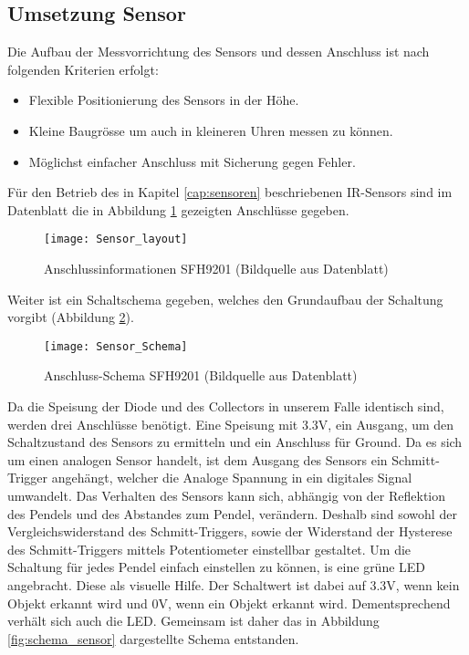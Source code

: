\subsection{Umsetzung Sensor}
	Die Aufbau der Messvorrichtung des Sensors und dessen Anschluss ist nach folgenden Kriterien erfolgt:
	\begin{itemize}
		\item Flexible Positionierung des Sensors in der Höhe.
		\item Kleine Baugrösse um auch in kleineren Uhren messen zu können.
		\item Möglichst einfacher Anschluss mit Sicherung gegen Fehler.
	\end{itemize}
	Für den Betrieb des in Kapitel \ref{cap:sensoren} beschriebenen IR-Sensors sind im Datenblatt die in Abbildung \ref{fig:info_SFH9201} gezeigten Anschlüsse gegeben.
	\begin{figure}[H]
		\centering
		\texttt{[image: Sensor\_layout]}
		\caption{Anschlussinformationen SFH9201 (Bildquelle aus Datenblatt)}
		\label{fig:info_SFH9201}
	\end{figure}
	Weiter ist ein Schaltschema gegeben, welches den Grundaufbau der Schaltung vorgibt (Abbildung \ref{fig:schema_SFH9201}).
	\begin{figure}[H]
		\centering
		\texttt{[image: Sensor\_Schema]}
		\caption{Anschluss-Schema SFH9201 (Bildquelle aus Datenblatt)}
		\label{fig:schema_SFH9201}
	\end{figure}
	\noindent Da die Speisung der Diode und des Collectors in unserem Falle identisch sind, werden drei Anschlüsse benötigt. Eine Speisung mit 3.3V, ein Ausgang, um den Schaltzustand des Sensors zu ermitteln und ein Anschluss für Ground. 
Da es sich um einen analogen Sensor handelt, ist dem Ausgang des Sensors ein Schmitt-Trigger angehängt, welcher die Analoge Spannung in ein digitales Signal umwandelt. 
Das Verhalten des Sensors kann sich, abhängig von der Reflektion des Pendels und des Abstandes zum Pendel, verändern. Deshalb sind sowohl der Vergleichswiderstand des Schmitt-Triggers, sowie der Widerstand der Hysterese des Schmitt-Triggers mittels Potentiometer einstellbar gestaltet. 
Um die Schaltung für jedes Pendel einfach einstellen zu können, is eine grüne LED angebracht. Diese als visuelle Hilfe. Der Schaltwert ist dabei auf 3.3V, wenn kein Objekt erkannt wird und 0V, wenn ein Objekt erkannt wird. Dementsprechend verhält sich auch die LED. Gemeinsam ist daher das in Abbildung \ref{fig:schema_sensor} dargestellte Schema entstanden.
